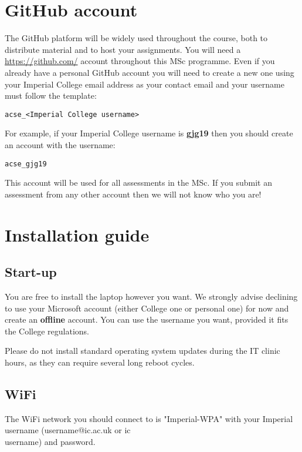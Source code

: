 \documentclass[11pt]{article}
\begin{document}
\section{GitHub account}

The GitHub platform will be widely used throughout the course, both to distribute material and to host your assignments. You will need a \url{https://github.com/} account throughout this MSc programme. Even if you already have a personal GitHub account you will need to create a new one using your Imperial College email address as your contact email and your username must follow the template:

\begin{verbatim}
acse_<Imperial College username>
\end{verbatim}

For example, if your Imperial College username is \textbf{gjg19} then you should create an account with the username:

\begin{verbatim}
acse_gjg19
\end{verbatim}

This account will be used for all assessments in the MSc. If you submit an assessment from any other account then we will not know who you are!


\section{Installation guide}

\subsection{Start-up}

You are free to install the laptop however you want. We strongly advise declining to use your Microsoft account (either College one or personal one) for now and create an {\bf offline} account. You can use the username you want, provided it fits the College regulations. 

Please do not install standard operating system updates during the IT clinic hours, as they can require several long reboot cycles.

\subsection{WiFi}
The WiFi network you should connect to is "Imperial-WPA" with your Imperial username (username@ic.ac.uk or ic\\username) and password.
\end{document}
